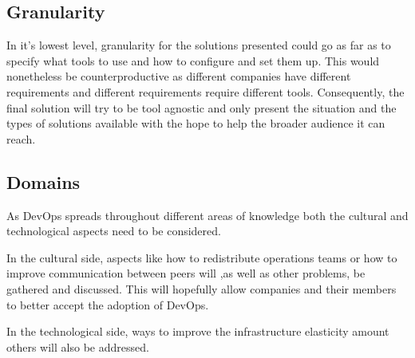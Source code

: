     		\subsection{Granularity}
    		In it's lowest level, granularity for the solutions presented could go as far as to specify what tools to use and how to configure and set them up. This would nonetheless be counterproductive as different companies have different requirements and different requirements require different tools. Consequently, the final solution will try to be tool agnostic and only present the situation and the types of solutions available with the hope to help the broader audience it can reach.

    		\subsection{Domains}
    
    		As DevOps spreads throughout different areas of knowledge both the cultural and technological aspects need to be considered. 
    
    		In the cultural side, aspects like how to redistribute operations teams or how to improve communication between peers will ,as well as other problems, be gathered and discussed. This will hopefully allow companies and their members to better accept the adoption of DevOps.
    
    		In the technological side, ways to improve the infrastructure elasticity amount others will also be addressed.  


